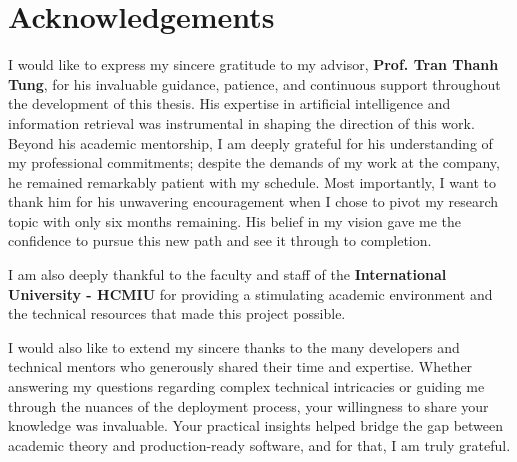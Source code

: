 \documentclass[12pt, twoside]{report}
\begin{document}
\begin{titlepage}
	\hspace{7cm}
	\makebox[7cm][l]{\underline{\hspace{7cm}}}
	\par \hspace{7cm}
	\par
	\vspace{0.75cm}
														
	\hspace{7cm}
	\par
	\thispagestyle{empty}
\end{titlepage}

\setcounter{page}{1}

\chapter*{Acknowledgements}

\noindent
I would like to express my sincere gratitude to my advisor, \textbf{Prof. Tran Thanh Tung}, for his invaluable guidance, patience, and continuous support throughout the development of this thesis. His expertise in artificial intelligence and information retrieval was instrumental in shaping the direction of this work. Beyond his academic mentorship, I am deeply grateful for his understanding of my professional commitments; despite the demands of my work at the company, he remained remarkably patient with my schedule. Most importantly, I want to thank him for his unwavering encouragement when I chose to pivot my research topic with only six months remaining. His belief in my vision gave me the confidence to pursue this new path and see it through to completion.

\noindent
I am also deeply thankful to the faculty and staff of the \textbf{International University - HCMIU} for providing a stimulating academic environment and the technical resources that made this project possible.


\noindent
I would also like to extend my sincere thanks to the many developers and technical mentors who generously shared their time and expertise. Whether answering my questions regarding complex technical intricacies or guiding me through the nuances of the deployment process, your willingness to share your knowledge was invaluable. Your practical insights helped bridge the gap between academic theory and production-ready software, and for that, I am truly grateful.
\end{document}
